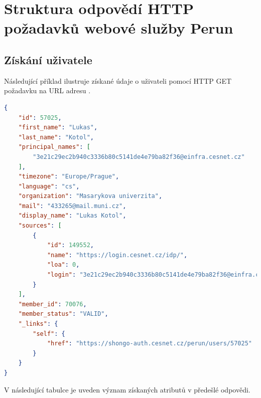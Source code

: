 \documentclass[
  printed, %
  twoside, %
  table,   %
  nolof,     %
  nolot,     %
]{fithesis3}
\begin{document}
\printbibliography[title={Literatura}]

\appendix %


\chapter{Struktura odpovědí HTTP požadavků webové služby Perun}

\section{Získání uživatele}
\label{table:perunws:user}
Následující příklad ilustruje získané údaje o uživateli pomocí HTTP GET požadavku na URL adresu .

\begin{lstlisting}[language=json,firstnumber=1]
{
    "id": 57025,
    "first_name": "Lukas",
    "last_name": "Kotol",
    "principal_names": [
        "3e21c29ec2b940c3336b80c5141de4e79ba82f36@einfra.cesnet.cz"
    ],
    "timezone": "Europe/Prague",
    "language": "cs",
    "organization": "Masarykova univerzita",
    "mail": "433265@mail.muni.cz",
    "display_name": "Lukas Kotol",
    "sources": [
        {
            "id": 149552,
            "name": "https://login.cesnet.cz/idp/",
            "loa": 0,
            "login": "3e21c29ec2b940c3336b80c5141de4e79ba82f36@einfra.cesnet.cz"
        }
    ],
    "member_id": 70076,
    "member_status": "VALID",
    "_links": {
        "self": {
            "href": "https://shongo-auth.cesnet.cz/perun/users/57025"
        }
    }
}
\end{lstlisting}
V následující tabulce je uveden význam získaných atributů v předešlé odpovědi.
\end{document}
